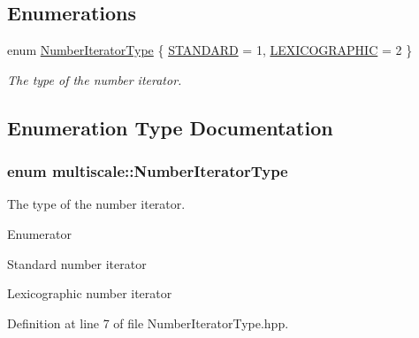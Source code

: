 \subsection*{Enumerations}
\begin{DoxyCompactItemize}
\item 
enum \hyperlink{namespacemultiscale_a6ef911f4d48a4bf5e657c237ec169ff5}{Number\-Iterator\-Type} \{ \hyperlink{namespacemultiscale_a6ef911f4d48a4bf5e657c237ec169ff5aa048887eb0360a4b70dff5452133f42e}{S\-T\-A\-N\-D\-A\-R\-D} = 1, 
\hyperlink{namespacemultiscale_a6ef911f4d48a4bf5e657c237ec169ff5a2cba3a0174cc5c1d555ee13dcf6cda15}{L\-E\-X\-I\-C\-O\-G\-R\-A\-P\-H\-I\-C} = 2
 \}
\begin{DoxyCompactList}\small\item\em The type of the number iterator. \end{DoxyCompactList}\end{DoxyCompactItemize}


\subsection{Enumeration Type Documentation}
\hypertarget{namespacemultiscale_a6ef911f4d48a4bf5e657c237ec169ff5}{
\subsubsection[{Number\-Iterator\-Type}]{\setlength{\rightskip}{0pt plus 5cm}enum {\bf multiscale\-::\-Number\-Iterator\-Type}}}\label{namespacemultiscale_a6ef911f4d48a4bf5e657c237ec169ff5}


The type of the number iterator. 

\begin{Desc}
\item[Enumerator]\par
\begin{description}
\item[{\em 
\hypertarget{namespacemultiscale_a6ef911f4d48a4bf5e657c237ec169ff5aa048887eb0360a4b70dff5452133f42e}{S\-T\-A\-N\-D\-A\-R\-D}\label{namespacemultiscale_a6ef911f4d48a4bf5e657c237ec169ff5aa048887eb0360a4b70dff5452133f42e}
}]Standard number iterator \item[{\em 
\hypertarget{namespacemultiscale_a6ef911f4d48a4bf5e657c237ec169ff5a2cba3a0174cc5c1d555ee13dcf6cda15}{L\-E\-X\-I\-C\-O\-G\-R\-A\-P\-H\-I\-C}\label{namespacemultiscale_a6ef911f4d48a4bf5e657c237ec169ff5a2cba3a0174cc5c1d555ee13dcf6cda15}
}]Lexicographic number iterator \end{description}
\end{Desc}


Definition at line 7 of file Number\-Iterator\-Type.\-hpp.

